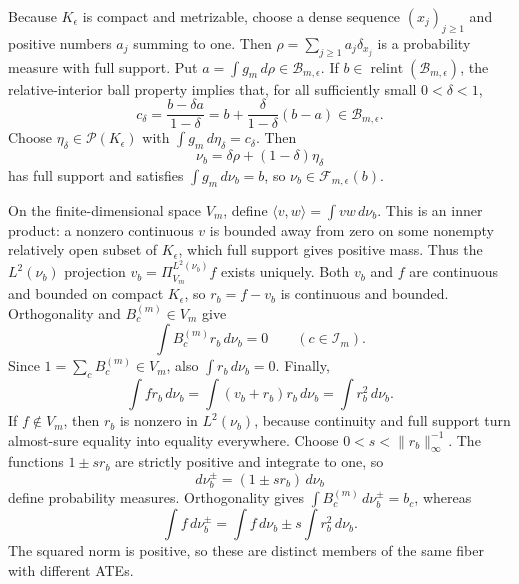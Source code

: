 Because \(K_{\epsilon}\) is compact and metrizable, choose a dense sequence \((x_j)_{j\geq1}\) and positive numbers \(a_j\) summing to one.  Then \(\rho=\sum_{j\geq1}a_j\delta_{x_j}\) is a probability measure with full support.  Put \(a=\int g_m\,d\rho\in\mathcal B_{m,\epsilon}\).  If \(b\in\operatorname{relint}(\mathcal B_{m,\epsilon})\), the relative-interior ball property implies that, for all sufficiently small \(0<\delta<1\),
\[
 c_{\delta}=\frac{b-\delta a}{1-\delta}
 =b+\frac{\delta}{1-\delta}(b-a)
 \in\mathcal B_{m,\epsilon}.
\]
Choose \(\eta_{\delta}\in\mathcal P(K_{\epsilon})\) with \(\int g_m\,d\eta_{\delta}=c_{\delta}\).  Then
\[
 \nu_b=\delta\rho+(1-\delta)\eta_{\delta}
\]
has full support and satisfies \(\int g_m\,d\nu_b=b\), so \(\nu_b\in\mathcal F_{m,\epsilon}(b)\).

On the finite-dimensional space \(V_m\), define \(\langle v,w\rangle=\int vw\,d\nu_b\).  This is an inner product: a nonzero continuous \(v\) is bounded away from zero on some nonempty relatively open subset of \(K_{\epsilon}\), which full support gives positive mass.  Thus the \(L^2(\nu_b)\) projection \(v_b=\Pi_{V_m}^{L^2(\nu_b)}f\) exists uniquely.  Both \(v_b\) and \(f\) are continuous and bounded on compact \(K_{\epsilon}\), so \(r_b=f-v_b\) is continuous and bounded.  Orthogonality and \(B_c^{(m)}\in V_m\) give
\[
 \int B_c^{(m)}r_b\,d\nu_b=0\qquad(c\in\mathcal I_m).
\]
Since \(1=\sum_cB_c^{(m)}\in V_m\), also \(\int r_b\,d\nu_b=0\).  Finally,
\[
 \int fr_b\,d\nu_b
 =\int(v_b+r_b)r_b\,d\nu_b
 =\int r_b^2\,d\nu_b.
\]
If \(f\notin V_m\), then \(r_b\) is nonzero in \(L^2(\nu_b)\), because continuity and full support turn almost-sure equality into equality everywhere.  Choose \(0<s<\lVert r_b\rVert_{\infty}^{-1}\).  The functions \(1\pm sr_b\) are strictly positive and integrate to one, so
\[
 d\nu_b^{\pm}=(1\pm sr_b)\,d\nu_b
\]
define probability measures.  Orthogonality gives \(\int B_c^{(m)}\,d\nu_b^{\pm}=b_c\), whereas
\[
 \int f\,d\nu_b^{\pm}
 =\int f\,d\nu_b\pm s\int r_b^2\,d\nu_b.
\]
The squared norm is positive, so these are distinct members of the same fiber with different ATEs.